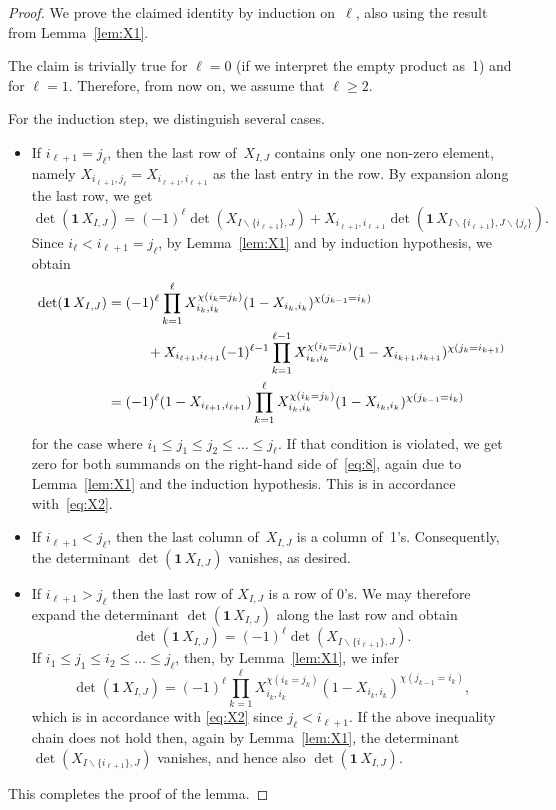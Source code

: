 \documentclass[10pt,a4paper]{amsart}
\begin{document}
\begin{proof}
We prove the claimed identity by induction on~$\ell$, also using
the result from Lemma~\ref{lem:X1}.

The claim is trivially true for $\ell=0$ (if we interpret the empty
product as~1)
and for $\ell=1$. Therefore, from now on, we assume that $\ell\ge2$.

For the induction step, we distinguish several cases.

\begin{itemize}
\item If $i_{\ell+1}= j_\ell$, then the last row of~$X_{I,J}$ 
contains only one non-zero element, namely
$X_{i_{\ell+1},j_\ell}=X_{i_{\ell+1},i_{\ell+1}}$
as the last entry in the row. By expansion along the last row,
we get
\begin{equation} \label{eq:8} 
\det(\mathbf1\,X_{I,J}) =
(-1)^{\ell}\det(X_{I\backslash\{i_{\ell+1}\},J})+
X_{ i_{\ell+1} ,i_{\ell+1}}
\det(\mathbf1\, X_{ I\backslash
\{ i_{\ell+1} \}, J\backslash \{ j_\ell \} }).
\end{equation}
Since $i_{\ell} <  i_{\ell+1}=j_\ell$, by Lemma~\ref{lem:X1} and
by induction hypothesis, we obtain
\begin{align*}
\det(\mathbf1\,X_{I,J}) &=(-1)^{\ell}
\prod _{k=1} ^{\ell}X_{i_k,i_k}^{\chi(i_k=j_k)}
(1-X_{i_k,i_k})^{\chi(j_{k-1}=i_k)}\\
&\kern1cm
+
X_{ i_{\ell+1} ,i_{\ell+1}}
(-1)^{\ell-1}\prod _{k=1} ^{\ell-1}X_{i_k,i_k}^{\chi(i_k=j_k)}
(1-X_{i_{k+1},i_{k+1}})^{\chi(j_{k}=i_{k+1})}\\
&=(-1)^{\ell}(1-X_{i_{\ell+1},i_{\ell+1}})
\prod _{k=1} ^{\ell}X_{i_k,i_k}^{\chi(i_k=j_k)}
(1-X_{i_{k},i_{k}})^{\chi(j_{k-1}=i_{k})}
\end{align*}
for the case where $i_1\le j_1\le j_2\le\dots\le j_\ell$.
If that condition is violated,
we get zero for both summands on the right-hand side of~\eqref{eq:8},
again due to Lemma~\ref{lem:X1} and the induction hypothesis.
This is in accordance with~\eqref{eq:X2}.
\item
If $i_{\ell+1} < j_\ell$, then the last 
column of~$X_{I,J}$ is a column of~1's. Consequently, the determinant
$\det(\mathbf1\,X_{I,J})$ vanishes, as
desired.
\item
If $i_{\ell+1} > j_\ell$ then the last row of $X_{I,J}$ is a row of 0's.
We may therefore expand the determinant $\det(\mathbf1\,X_{I,J})$
along the last row and obtain
$$
\det(\mathbf1\,X_{I,J})=(-1)^{\ell}
\det(X_{I\backslash\{i_{\ell+1}\},J}).
$$
If $i_1\le j_1\le i_2\le \dots\le j_\ell$, then, by
Lemma~\ref{lem:X1}, we infer
$$
\det(\mathbf1\,X_{I,J})=(-1)^{\ell}
\prod _{k=1} ^{\ell}X_{i_k,i_k}^{\chi(i_k=j_k)}
(1-X_{i_{k},i_{k}})^{\chi(j_{k-1}=i_{k})},
$$
which is in accordance with \eqref{eq:X2} since $j_\ell<i_{\ell+1}$.
If the above inequality chain does not hold then, again by
Lemma~\ref{lem:X1}, the determinant
$\det(X_{I\backslash\{i_{\ell+1}\},J})$ vanishes, and hence also
$\det(\mathbf1\,X_{I,J})$.
\end{itemize}
This completes the proof of the lemma.
\end{proof}
\end{document}
